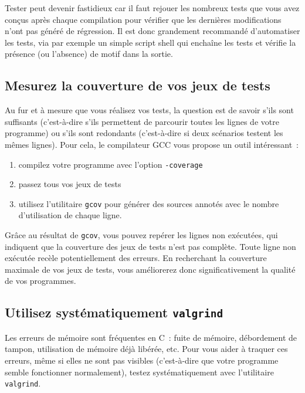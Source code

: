 \documentclass {article}
\begin{document}
Tester peut devenir fastidieux car il faut rejouer les nombreux tests
que vous avez conçus après chaque compilation pour vérifier que les
dernières modifications n'ont pas généré de régression. Il est
donc grandement recommandé d'automatiser les tests, via par exemple
un simple script shell qui enchaîne les tests et vérifie la présence
(ou l'absence) de motif dans la sortie.


\subsection {Mesurez la couverture de vos jeux de tests}

Au fur et à mesure que vous réalisez vos tests, la question est
de savoir s'ils sont suffisants (c'est-à-dire s'ils permettent de
parcourir toutes les lignes de votre programme) ou s'ils sont redondants
(c'est-à-dire si deux scénarios testent les mêmes lignes). Pour cela,
le compilateur GCC vous propose un outil intéressant~:

\begin {enumerate}
    \item compilez votre programme avec l'option \texttt {-coverage}
    \item passez tous vos jeux de tests
    \item utilisez l'utilitaire \texttt {gcov} pour générer des sources
	annotés avec le nombre d'utilisation de chaque ligne.

\end {enumerate}

Grâce au résultat de \texttt {gcov}, vous pouvez repérer les lignes
non exécutées, qui indiquent que la couverture des jeux de tests n'est
pas complète. Toute ligne non exécutée recèle potentiellement des
erreurs.  En recherchant la couverture maximale de vos jeux de tests,
vous améliorerez donc significativement la qualité de vos programmes.


\subsection {Utilisez systématiquement \texttt {valgrind}}

Les erreurs de mémoire sont fréquentes en C~: fuite de mémoire,
débordement de tampon, utilisation de mémoire déjà libérée,
etc. Pour vous aider à traquer ces erreurs, même si elles ne sont
pas visibles (c'est-à-dire que votre programme semble fonctionner
normalement), testez systématiquement avec l'utilitaire \texttt
{valgrind}.
\end{document}
